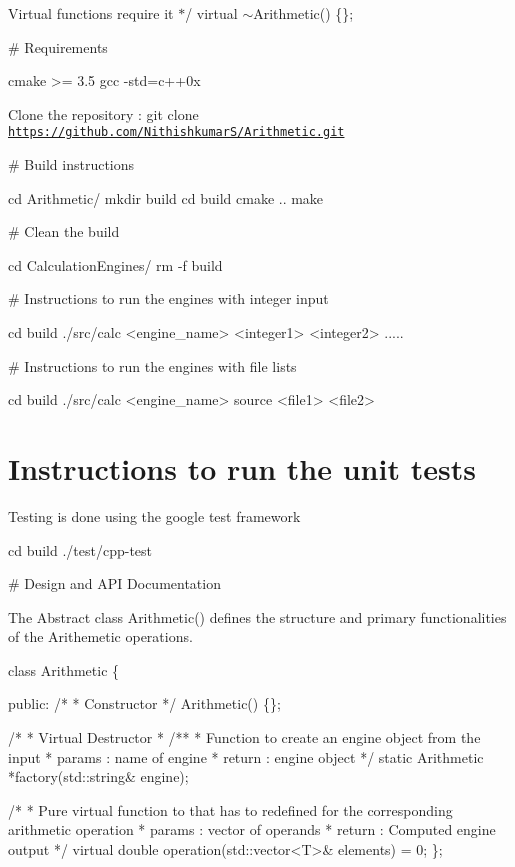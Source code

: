 Virtual functions require it $\ast$/ virtual $\sim$\+Arithmetic() \{\};

\# Requirements 
\begin{DoxyCode}
cmake >= 3.5
gcc -std=c++0x
\end{DoxyCode}
 Clone the repository \+: git clone \href{https://github.com/NithishkumarS/Arithmetic.git}{\tt https\+://github.\+com/\+Nithishkumar\+S/\+Arithmetic.\+git}

\# Build instructions 
\begin{DoxyCode}
cd Arithmetic/
mkdir build
cd build
cmake ..
make
\end{DoxyCode}


\# Clean the build 
\begin{DoxyCode}
cd CalculationEngines/
rm -f build
\end{DoxyCode}


\# Instructions to run the engines with integer input 
\begin{DoxyCode}
cd build
./src/calc <engine\_name> <integer1> <integer2> .....
\end{DoxyCode}


\# Instructions to run the engines with file lists 
\begin{DoxyCode}
cd build
./src/calc <engine\_name> source <file1> <file2>
\end{DoxyCode}


\section*{Instructions to run the unit tests}

Testing is done using the google test framework 
\begin{DoxyCode}
cd build
./test/cpp-test
\end{DoxyCode}



\begin{DoxyCode}
# Design and API Documentation
\end{DoxyCode}
 The Abstract class Arithmetic() defines the structure and primary functionalities of the Arithemetic operations. 
\begin{DoxyCode}
class Arithmetic \{

public:
    /*
     * Constructor
     */
    Arithmetic() \{\};

    /*
     * Virtual Destructor
     *  /**
     * Function to create an engine object from the input
     * params :  name of engine
     * return :  engine object
     */
    static Arithmetic *factory(std::string& engine);

    /*
     * Pure virtual function to that has to redefined for the corresponding arithmetic operation
     * params :  vector of operands
     * return :  Computed engine output
     */
    virtual double operation(std::vector<T>& elements) = 0;
\};
\end{DoxyCode}


